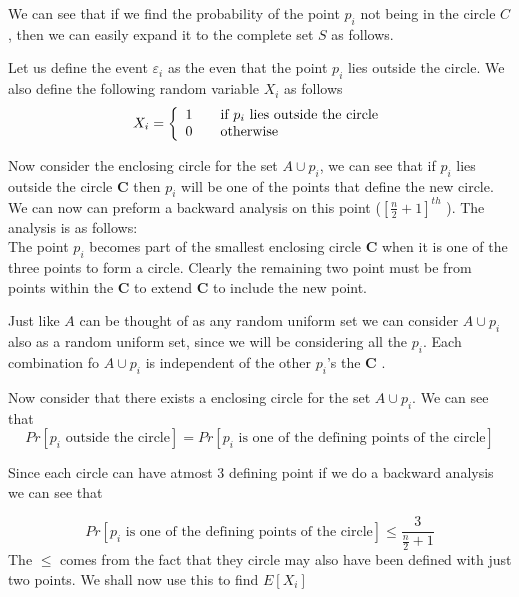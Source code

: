 \documentclass{assignment}
\begin{document}
\begin{problemlist}
\begin{problem}
\begin{answer}
We can see that if we find the probability of the point $p_i$ not being in the circle $C$, then we can easily expand it to the complete set $S$ as follows. 

Let us define the event $\varepsilon_i$ as the even that the point $p_i$ lies outside the circle. We also define the following random variable $X_i$ as follows 
\begin{equation}
  X_i = \left\{ 
  \begin{array}{l l}
    1 & \quad \text{if $p_i$ lies outside the circle}\\
    0 & \quad \text{otherwise}\\
  \end{array} \right.
\end{equation}

Now consider the enclosing circle for the set $A \cup p_i$, we can see that if $p_i$ lies outside the circle $\mathbf{C}$ then $p_i$ will be one of the points that define the new circle. We can now can preform a 
backward analysis on this point ($[\frac{n}{2} +1]^{th}$ ). The analysis is as
follows:\\

The point $p_i$ becomes part of the smallest enclosing circle $\mathbf{C}$ when it is one of the three points to form a  circle. Clearly the remaining two point must be from points within the $\mathbf{C}$ to extend $\mathbf{C}$ to include the new point.

Just like $A$ can be thought of as any random uniform set we can consider $A \cup p_i$ also as a random uniform set, since we will be considering all the $p_i$. Each combination fo $A \cup p_i$ is independent of the other $p_i$'s the $\mathbf{C}$ .

Now consider that there exists a enclosing circle for the set $A \cup p_i$. We can see that \\
\begin{equation}
 Pr[\text{$p_i$ outside the circle}] = Pr[\text{$p_i$ is one of the defining points of the circle}]
\end{equation}

Since each circle can have atmost $3$ defining point if we do a backward analysis we can see that 
 
\begin{equation}
Pr[\text{$p_i$ is one of the defining points of the circle}] \leq \frac{3}{\frac{n}{2} + 1}
\end{equation}
The $\leq$ comes from the fact that they circle may also have been defined with just two points. We shall now use this to find $E[X_i]$


\end{answer}
\end{problem}
\end{problemlist}
\end{document}
